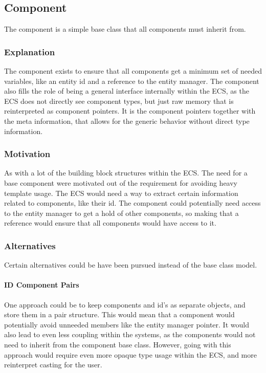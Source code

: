 \subsection{Component}
\label{subsec:detailed_component}
The component is a simple base class that all components must inherit from.

\subsubsection{Explanation}
The component exists to ensure that all components get a minimum set of needed
variables, like an entity id and a reference to the entity manager.
The component also fills the role of being a general interface
internally within the ECS, as the ECS does not directly see component types,
but just raw memory that is reinterpreted as component pointers.
It is the component pointers together with the meta information,
that allows for the generic behavior without direct type information.

\subsubsection{Motivation}
As with a lot of the building block structures within the ECS. The need for a base component
were motivated out of the requirement for avoiding heavy template usage.
The ECS would need a way to extract certain information related to components,
like their id. The component could potentially need access to the entity manager
to get a hold of other components, so making that a reference
would ensure that all components would have access to it.

\subsubsection{Alternatives}
Certain alternatives could be have been pursued instead of the base class model.

\paragraph{ID Component Pairs}
One approach could be to keep components and id's as separate objects, and store them in a pair structure.
This would mean that a component would potentially avoid unneeded members like the entity manager pointer.
It would also lead to even less coupling within the systems,
as the components would not need to inherit from the component base class.
However, going with this approach would require even more opaque type usage within the ECS,
and more reinterpret casting for the user.

